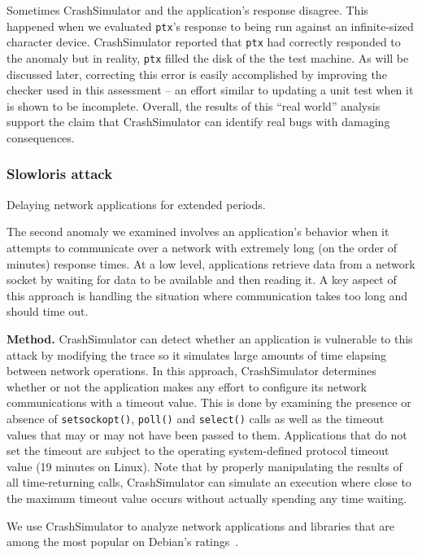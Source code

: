 Sometimes CrashSimulator and the application's response disagree.  This
happened when we evaluated {\tt ptx}'s response to being run against an
infinite-sized character device.  CrashSimulator reported that {\tt ptx}
had correctly responded to the anomaly but in reality, {\tt ptx} filled the
disk of the the test machine.  As will be discussed later, correcting this
error is easily accomplished by improving the checker used in this
assessment -- an effort similar to updating a unit test when it is shown to
be incomplete.  Overall, the results of this ``real world'' analysis
support the claim that CrashSimulator can identify real bugs with damaging
consequences.

\subsubsection{Slowloris attack} Delaying network applications for extended
periods.


The second anomaly we examined involves an application's behavior when it
attempts to communicate over a network with extremely long (on the order of
minutes) response times.  At a low level, applications retrieve data from a
network socket by waiting for data to be available and then reading it.  A
key aspect of this approach is handling the situation where communication
takes too long and should time out.

{\bf Method.} CrashSimulator can detect whether an application is
vulnerable to this attack by modifying the trace so it simulates large
amounts of time elapsing between network operations.  In this approach,
CrashSimulator determines whether or not the application makes any effort
to configure its network communications with a timeout value. This is done
by examining the presence or absence of {\tt setsockopt()}, {\tt poll()}
and {\tt select()} calls as well as the timeout values that may or may not
have been passed to them. Applications that do not set the timeout are
subject to the operating system-defined protocol timeout value (19 minutes
on Linux).  Note that by properly manipulating the results of all
time-returning calls, CrashSimulator can simulate an execution where close
to the maximum timeout value occurs without actually spending any time
waiting.


We use CrashSimulator to analyze  network applications and libraries that
are among the most popular on Debian's ratings~\cite{DebPopCon}.

